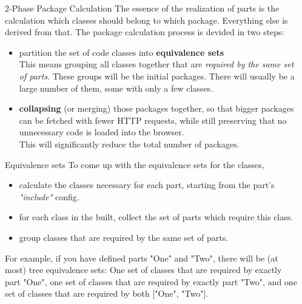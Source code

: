 \documentclass[final]{beamer}
\newlength{\sepwid}
\newlength{\onecolwid}
\begin{document}
\begin{frame}[t]
\begin{columns}[t]

    \begin{column}{\sepwid}\end{column}			%
    \begin{column}{\onecolwid}
      \begin{block}{2-Phase Package Calculation}
        The essence of the realization of parts is the calculation which classes should
        belong to which package. Everything else is derived from that. The
        package calculation process is devided in two steps:
        \begin{itemize}
          \item partition the set of code classes into \textbf{equivalence
            sets} \\
            This means grouping all classes together that are \textit{required by the
            same set of parts}. These groups will be the initial packages. There
            will usually be a large number of them, some with only a few classes.
          \item \textbf{collapsing} (or merging) those packages together, so
            that bigger packages can be fetched with fewer HTTP requests,
            while still preserving that no unnecessary code is loaded into the
            browser.\\
            This will significantly reduce the total number of packages.
        \end{itemize}
      \end{block}

      \begin{block}{Equivalence sets}
        To come up with the equivalence sets for the classes,
        \begin{itemize}
          \item calculate the classes necessary for each part, starting from the
            part's \textit{"include"} config.
          \item for each class in the built, collect the set of parts which
            require this class.
          \item group classes that are required by the same set of parts.
        \end{itemize}
        For example, if you have defined parts "One" and "Two", there will be
        (at most) tree equivalence sets: One set of classes that are required by
        exactly part "One", one set of classes that are required by exactly part
        "Two", and one set of classes that are required by both ["One", "Two"].


\end{block}
\end{column}
\end{columns}
\end{frame}
\end{document}
